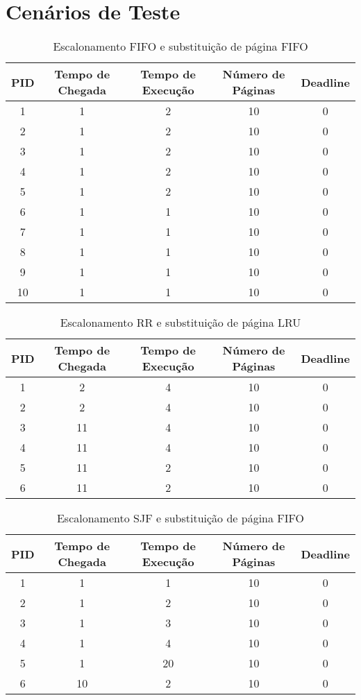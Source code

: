 \documentclass{article}
\begin{document}
\section{Cenários de Teste}
\begin{table}[!htbp]
\centering
\caption{Escalonamento FIFO e substituição de página FIFO}
\label{undefined}
\begin{tabular}{|c|c|c|c|c|}
\hline
PID & Tempo de Chegada & Tempo de Execução & Número de Páginas & Deadline \\ \hline
   1&    1&    2&    10& 0\\ \hline
   2&    1&   2&    10& 0\\ \hline
   3&    1&   2&    10& 0	\\ \hline
   4&    1&   2&    10& 0	\\ \hline
   5&    1&   2&    10& 0	\\ \hline
   6&    1&   1&    10& 0\\ \hline
   7&    1&   1&    10& 0\\ \hline
   8&    1&   1&    10& 0\\ \hline
   9&    1&   1&    10& 0\\ \hline
   10&   1&  1&    10& 0\\ \hline
\end{tabular}
\end{table}
%
\begin{table}[!htbp]
\centering
\caption{Escalonamento RR e substituição de página LRU}
\label{undefined}
\begin{tabular}{|c|c|c|c|c|}
\hline
PID & Tempo de Chegada & Tempo de Execução & Número de Páginas & Deadline \\ \hline
   1&     2& 4&    10& 0\\ \hline
   2&    2& 4&    10& 0\\ \hline
   3&    11&   4&    10& 0	\\ \hline
   4&    11&   4&    10& 0	\\ \hline
   5&    11&   2&    10& 0	\\ \hline
   6&    11&   2&    10& 0	\\ \hline
\end{tabular}
\end{table}
%		
\begin{table}[!htbp]
\centering
\caption{Escalonamento SJF e substituição de página FIFO}
\label{undefined}
\begin{tabular}{|c|c|c|c|c|}
\hline
PID & Tempo de Chegada & Tempo de Execução & Número de Páginas & Deadline \\ \hline
   1&    1&    1&    10& 0\\ \hline
   2&    1&   2&    10& 0\\ \hline
   3&    1&   3&    10& 0	\\ \hline
   4&    1&   4&    10& 0	\\ \hline
   5&    1&   20&    10& 0	\\ \hline
   6&    10&   2&    10& 0	\\ \hline 	
\end{tabular}
\end{table}
\end{document}
